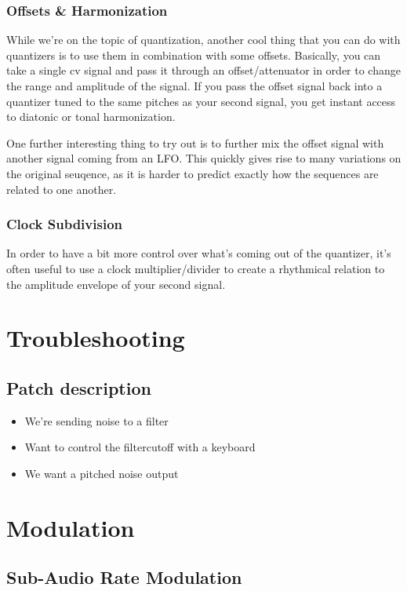 \documentclass[11pt]{article}
\begin{document}
\subsubsection{Offsets \& Harmonization}
\label{sec:org6c9469d}
While we're on the topic of quantization, another cool thing that you
can do with quantizers is to use them in combination with some
offsets. 
Basically, you can take a single cv signal and pass it through an
offset/attenuator in order to change the range and amplitude of the
signal. If you pass the offset signal back into a quantizer tuned to
the same pitches as your second signal, you get instant access to
diatonic or tonal harmonization. 

One further interesting thing to try out is to further mix the offset
signal with another signal coming from an LFO. This quickly gives rise
to many variations on the original seuqence, as it is harder to
predict exactly how the sequences are related to one another.

\subsubsection{Clock Subdivision}
\label{sec:org972eaa9}
In order to have a bit more control over what's coming out of the
quantizer, it's often useful to use a clock multiplier/divider to
create a rhythmical relation to the amplitude envelope of your second
signal. 


\section{Troubleshooting}
\label{sec:orgb25c3dc}

\subsection{Patch description}
\label{sec:orgfdb1449}

\begin{itemize}
\item We're sending noise to a filter
\item Want to control the filtercutoff with a keyboard
\item We want a pitched noise output
\end{itemize}

\section{Modulation}
\label{sec:orgfd8fb63}
\subsection{Sub-Audio Rate Modulation}
\label{sec:org5093aac}
\end{document}
